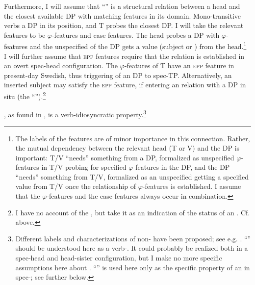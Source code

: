 \documentclass[output=paper]{langscibook}
\begin{document}
Furthermore, I will assume that “” is a  structural relation between a head and the closest available DP with matching features in its  domain. Mono-transitive verbs  a DP in its  position, and T probes the closest DP. I will take the relevant features to be $\varphi $-features and case features. The head probes a DP with $\varphi $-features and the unspecified  of the DP gets a value (subject or ) from the head.\footnote{The labels of the features are of minor importance in this connection. Rather, the mutual dependency between the relevant head (T or V) and the DP is important: T/V “needs” something from a DP, formalized as unspecified $\varphi ${}-features in T/V probing for specified $\varphi ${}-features in the DP, and the DP “needs” something from T/V, formalized as an unspecified  getting a specified value from T/V once the  relationship of $\varphi ${}-features is established. I assume that the $\varphi ${}-features and the case features always occur in combination.} I will further assume that \textsc{epp} features require that the  relation is established in an overt spec-head configuration. The $\varphi $-features of T have an \textsc{epp} feature in present-day Swedish, thus triggering  of an DP to spec-TP. Alternatively, an inserted  subject may satisfy the \textsc{epp} feature, if entering an  relation with a DP in situ (the “”).\footnote{I have no account of the , but take it as an indication of the status of an . Cf.  above.}



, as found in , is a verb-idiosyncratic property.\footnote{Different labels and characterizations of non- have been proposed; see e.g. \citet[181–182]{Thrainsson2001}. “” should be understood here as a verb-. It could probably be realized both in a spec-head and head-sister configuration, but I make no more specific assumptions here about .  “” is used here only as the specific property of an  in spec-; see further below.} 
\end{document}

